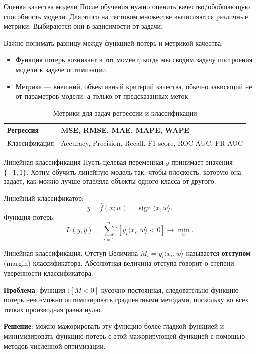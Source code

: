 \documentclass[notheorems, handout]{beamer}
\begin{document}
\begin{frame}{Оценка качества модели}
	После обучения нужно оценить качество/обобщающую способность модели. Для этого на тестовом множестве вычисляются различные метрики. Выбираются они в зависимости от задачи.\smallskip

	Важно понимать разницу между функцией потерь и метрикой качества:
	\begin{itemize}
		\item Функция потерь возникает в тот момент, когда мы сводим задачу построения модели к задаче оптимизации.
		\item Метрика — внешний, объективный критерий качества, обычно зависящий не от параметров модели, а только от предсказанных меток.
	\end{itemize}
	\begin{table}[h!]
		\centering
		\caption{Метрики для задач регрессии и классификации}
		\begin{tabular}{|p{3cm}|p{6cm}|}
			\hline
			Регрессия & MSE, RMSE, MAE, MAPE, WAPE \\
			\hline
			Классификация & Accuracy, Precision, Recall, F1-score, ROC AUC, PR AUC \\
			\hline
		\end{tabular}
	\end{table}\medskip
\end{frame}

\begin{frame}{Линейная классификация}
	Пусть целевая переменная $y$ принимает значения $\{-1, 1\}$. Хотим обучить линейную модель так, чтобы плоскость, которую она задает, как можно лучше отделяла объекты одного класса от другого.\medskip

	Линейный классификатор:
	\[
		\hat y = \hat f(x; w) = \operatorname{sign} \langle x, w\rangle.
	\]
	Функция потерь:
	\[
		L(y, \hat{y}) = \sum_{i=1}^{n}\mathbb{I}[y_i \langle x_i, w\rangle < 0] \longrightarrow \min_{w}.
	\]
\end{frame}

\begin{frame}{Линейная классификация. Отступ}
	Величина $M_i=y_i \langle x_i, w\rangle$ называется \textbf{отступом} (margin) классификатора. Абсолютная величина отступа говорит о степени уверенности классификатора.\medskip

	\textbf{Проблема}: функция $\mathbb{I}[M < 0]$ кусочно-постоянная, следовательно функцию потерь невозможно оптимизировать градиентными методами, поскольку во всех точках производная равна нулю.\medskip

	\textbf{Решение}: можно мажорировать эту функцию более гладкой функцией и минимизировать функцию потерь с этой мажорирующей функцией с помощью методов численной оптимизации.
\end{frame}
\end{document}
